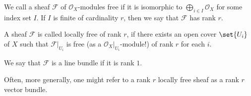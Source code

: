We call a sheaf $\mathcal{F}$ of $\mathcal{O}_X$-modules free if it is isomorphic to
$\bigoplus_{i \in I}\mathcal{O}_X$ for some index set $I$. If $I$ is finite of
cardinality $r$, then we say that $\mathcal{F}$ has rank $r$.

A sheaf $\mathcal{F}$ is called locally free of rank $r$, if there exists an
open cover $\set{U_i}$ of $X$ such that $\mathcal{F}|_{U_i}$ is free (as a $\mathcal{O}_X|_{U_i}$-module!) of rank $r$
for each $i$.

We say that $\mathcal{F}$ is a line bundle if it is rank $1$.

Often, more generally, one might refer to a rank $r$ locally free sheaf as a
rank $r$ vector bundle.
